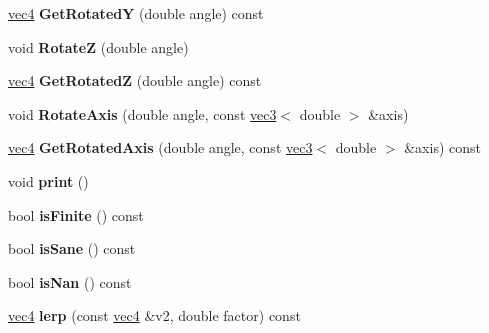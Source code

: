 \begin{DoxyCompactItemize}
\item 
\hypertarget{classmath_1_1vec4_ae2fa7626a83ef0822988f19307180de2}{
\hyperlink{classmath_1_1vec4}{vec4} {\bfseries GetRotatedY} (double angle) const }
\label{classmath_1_1vec4_ae2fa7626a83ef0822988f19307180de2}

\item 
\hypertarget{classmath_1_1vec4_a349ebea54d9ce7c5ef463fca34459e57}{
void {\bfseries RotateZ} (double angle)}
\label{classmath_1_1vec4_a349ebea54d9ce7c5ef463fca34459e57}

\item 
\hypertarget{classmath_1_1vec4_a53bdb8d390e031bf3417bd348d3c5fa5}{
\hyperlink{classmath_1_1vec4}{vec4} {\bfseries GetRotatedZ} (double angle) const }
\label{classmath_1_1vec4_a53bdb8d390e031bf3417bd348d3c5fa5}

\item 
\hypertarget{classmath_1_1vec4_a382b2444eb106f44d5cc2c7655af3cfa}{
void {\bfseries RotateAxis} (double angle, const \hyperlink{classmath_1_1vec3}{vec3}$<$ double $>$ \&axis)}
\label{classmath_1_1vec4_a382b2444eb106f44d5cc2c7655af3cfa}

\item 
\hypertarget{classmath_1_1vec4_a3d4f97340272607e17aa236624ae102b}{
\hyperlink{classmath_1_1vec4}{vec4} {\bfseries GetRotatedAxis} (double angle, const \hyperlink{classmath_1_1vec3}{vec3}$<$ double $>$ \&axis) const }
\label{classmath_1_1vec4_a3d4f97340272607e17aa236624ae102b}

\item 
\hypertarget{classmath_1_1vec4_a48e9b9e91a4ff955973b346b957337c6}{
void {\bfseries print} ()}
\label{classmath_1_1vec4_a48e9b9e91a4ff955973b346b957337c6}

\item 
\hypertarget{classmath_1_1vec4_af9978d557d5797a13f36357df993f5d4}{
bool {\bfseries isFinite} () const }
\label{classmath_1_1vec4_af9978d557d5797a13f36357df993f5d4}

\item 
\hypertarget{classmath_1_1vec4_a14768ae8c7e4252fb218cbd3ab8b4026}{
bool {\bfseries isSane} () const }
\label{classmath_1_1vec4_a14768ae8c7e4252fb218cbd3ab8b4026}

\item 
\hypertarget{classmath_1_1vec4_a140975d6e39a5a36c81856c5ed5333d0}{
bool {\bfseries isNan} () const }
\label{classmath_1_1vec4_a140975d6e39a5a36c81856c5ed5333d0}

\item 
\hypertarget{classmath_1_1vec4_a2dc379f5e8428a4f236cd332ee322b8c}{
\hyperlink{classmath_1_1vec4}{vec4} {\bfseries lerp} (const \hyperlink{classmath_1_1vec4}{vec4} \&v2, double factor) const }
\label{classmath_1_1vec4_a2dc379f5e8428a4f236cd332ee322b8c}


\end{DoxyCompactItemize}
